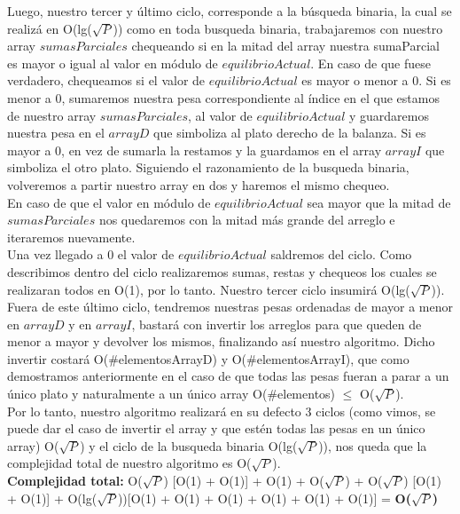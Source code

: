 Luego, nuestro tercer y \'ultimo ciclo, corresponde a la b\'usqueda binaria, la cual se realiz\'a en O(lg($\sqrt{P}$)) como en toda busqueda binaria, trabajaremos con nuestro array $sumasParciales$ chequeando si en la mitad del array nuestra sumaParcial es mayor o igual al valor en m\'odulo de $equilibrioActual$. En caso de que fuese verdadero, chequeamos si el valor de $equilibrioActual$ es mayor o menor a 0. Si es menor a 0, sumaremos nuestra pesa correspondiente al \'indice en el que estamos de nuestro array $sumasParciales$, al valor de $equilibrioActual$ y guardaremos nuestra pesa en el $arrayD$ que simboliza al plato derecho de la balanza. Si es mayor a 0, en vez de sumarla la restamos y la guardamos en el array $arrayI$ que simboliza el otro plato. Siguiendo el razonamiento de la busqueda binaria, volveremos a partir nuestro array en dos y haremos el mismo chequeo.\\
En caso de que el valor en m\'odulo de $equilibrioActual$ sea mayor que la mitad de $sumasParciales$ nos quedaremos con la mitad m\'as grande del arreglo e iteraremos nuevamente.\\
Una vez llegado a 0 el valor de $equilibrioActual$ saldremos del ciclo. Como describimos dentro del ciclo realizaremos sumas, restas y chequeos los cuales se realizaran todos en O(1), por lo tanto. Nuestro tercer ciclo insumir\'a O(lg($\sqrt{P}$)).\\

Fuera de este \'ultimo ciclo, tendremos nuestras pesas ordenadas de mayor a menor en $arrayD$ y en $arrayI$, bastar\'a con invertir los arreglos para que queden de menor a mayor y devolver los mismos, finalizando as\'i nuestro algoritmo. Dicho invertir costar\'a O($\#$elementosArrayD) y O($\#$elementosArrayI), que como demostramos anteriormente en el caso de que todas las pesas fueran a parar a un \'unico plato y naturalmente a un \'unico array O($\#$elementos) $\leq$ O($\sqrt{P}$).\\

Por lo tanto, nuestro algoritmo realizar\'a en su defecto 3 ciclos (como vimos, se puede dar el caso de invertir el array y que est\'en todas las pesas en un \'unico array) O($\sqrt{P}$) y el ciclo de la busqueda binaria O(lg($\sqrt{P}$)), nos queda que la complejidad total de nuestro algoritmo es O($\sqrt{P}$).\\

\textbf{Complejidad total:} O($\sqrt{P}$) [O(1) + O(1)] + O(1) + O($\sqrt{P}$) + O($\sqrt{P}$) [O(1) + O(1)] + O(lg($\sqrt{P}$))[O(1) + O(1) + O(1) + O(1) + O(1) + O(1)] = \textbf{O($\sqrt{P}$)}